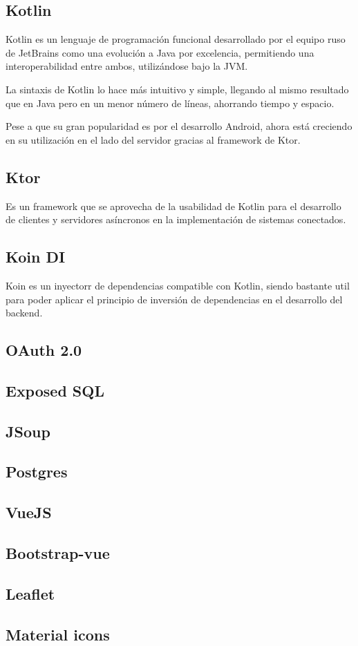     \subsection{Kotlin}

Kotlin es un lenguaje de programación funcional desarrollado por el equipo ruso de JetBrains como una evolución a Java por excelencia, permitiendo una interoperabilidad entre ambos, utilizándose bajo la JVM.

La sintaxis de Kotlin lo hace más intuitivo y simple, llegando al mismo resultado que en Java pero en un menor número de líneas, ahorrando tiempo y espacio.

Pese a que su gran popularidad es por el desarrollo Android, ahora está creciendo en su utilización en el lado del servidor gracias al framework de Ktor. 

    \subsection{Ktor}

Es un framework que se aprovecha de la usabilidad de Kotlin para el desarrollo de clientes y servidores asíncronos en la implementación de sistemas conectados.

    \subsection{Koin DI}

Koin es un inyectorr de dependencias compatible con Kotlin, siendo bastante util para poder aplicar el principio de inversión de dependencias en el desarrollo del backend.    

    \subsection{OAuth 2.0}
    
    \subsection{Exposed SQL}
    \subsection{JSoup}
    \subsection{Postgres}
    \subsection{VueJS}
    \subsection{Bootstrap-vue}
    \subsection{Leaflet}
    \subsection{Material icons}